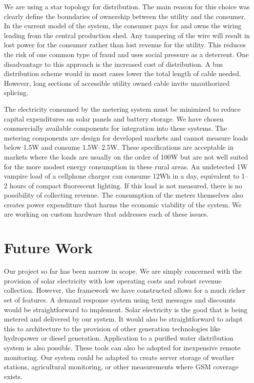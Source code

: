 \documentclass[conference]{IEEEtran}
\begin{document}
We are using a star topology for distribution.  The main reason for this
choice was clearly define the boundaries of ownership between the utility
and the consumer.  In the current model of the system, the consumer pays for
and owns the wiring leading from the central production shed.  Any tampering
of the wire will result in lost power for the consumer rather than lost 
revenue for the utility.  This reduces the risk of one common type of fraud
and uses social pressure as a deterrent.
One disadvantage to this approach is the increased cost of distribution.
A bus distribution scheme would in most cases lower the total length of 
cable needed.  However, long sections of accessible utility owned cable 
invite unauthorized splicing.


The electricity consumed by the metering system must be minimized to 
reduce capital expenditures on solar panels and battery storage.  We 
have chosen commercially available components for integration into
these systems.  The metering components are design for developed markets
and cannot measure loads below 1.5W and consume 1.5W--2.5W.  These 
specifications are acceptable in markets where the loads are usually
on the order of 100W but are not well suited for the more modest 
energy consumption in these rural areas.  An undetected 1W vampire load of a
cellphone charger can consume 12Wh in a day, equivalent to 1--2 hours
of compact fluorescent lighting.  If this load is not measured, there 
is no possibility of collecting revenue.  The consumption of the meters
themselves also creates power expenditure that harms the economic viability
of the system.  We are working on custom hardware that addresses each 
of these issues.


\section{Future Work}
Our project so far has been narrow in scope.  We are simply concerned with the
provision of solar electricity with low operating costs and robust revenue 
collection.  However, the framework we have constructed allows for a much 
richer set of features.  
A demand response system using text messages and discounts
would be straightforward to implement.  
Solar electricity is the good that is being metered and delivered by our
system.  It would also be straightforward to adapt this to architecture
to the provision of other generation technologies like hydropower or 
diesel generation.  Application to a purified water distribution system
is also possible.  
These tools can also be adopted for inexpensive remote monitoring.  Our 
system could be adapted to create server storage of weather stations, 
agricultural monitoring, or other measurements where GSM coverage exists.
\end{document}
